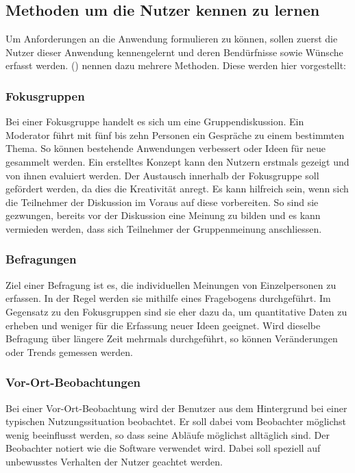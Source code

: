 \subsection{Methoden um die Nutzer kennen zu lernen}
Um Anforderungen an die Anwendung formulieren zu können, sollen zuerst die Nutzer dieser Anwendung kennengelernt und deren Bendürfnisse sowie Wünsche erfasst werden.
\citeauthor{usability} (\citeyear{usability}) nennen dazu mehrere Methoden.
Diese werden hier vorgestellt:

\subsubsection{Fokusgruppen}\label{fokusgruppe}
Bei einer Fokusgruppe handelt es sich um eine Gruppendiskussion.
Ein Moderator führt mit fünf bis zehn Personen ein Gespräche zu einem bestimmten Thema.
So können bestehende Anwendungen verbessert oder Ideen für neue gesammelt werden.
Ein erstelltes Konzept kann den Nutzern erstmals gezeigt und von ihnen evaluiert werden.
Der Austausch innerhalb der Fokusgruppe soll gefördert werden, da dies die Kreativität anregt.
Es kann hilfreich sein, wenn sich die Teilnehmer der Diskussion im Voraus auf diese vorbereiten.
So sind sie gezwungen, bereits vor der Diskussion eine Meinung zu bilden und es kann vermieden werden, dass sich Teilnehmer der Gruppenmeinung anschliessen.


\subsubsection{Befragungen}\label{befragung}
Ziel einer Befragung ist es, die individuellen Meinungen von Einzelpersonen zu erfassen.
In der Regel werden sie mithilfe eines Fragebogens durchgeführt.
Im Gegensatz zu den Fokusgruppen sind sie eher dazu da, um quantitative Daten zu erheben und weniger für die Erfassung neuer Ideen geeignet.
Wird dieselbe Befragung über längere Zeit mehrmals durchgeführt, so können Veränderungen oder Trends gemessen werden.


\subsubsection{Vor-Ort-Beobachtungen}\label{vorort}
Bei einer Vor-Ort-Beobachtung wird der Benutzer aus dem Hintergrund bei einer typischen Nutzungssituation beobachtet.
Er soll dabei vom Beobachter möglichst wenig beeinflusst werden, so dass seine Abläufe möglichst alltäglich sind.
Der Beobachter notiert wie die Software verwendet wird.
Dabei soll speziell auf unbewusstes Verhalten der Nutzer geachtet werden.



